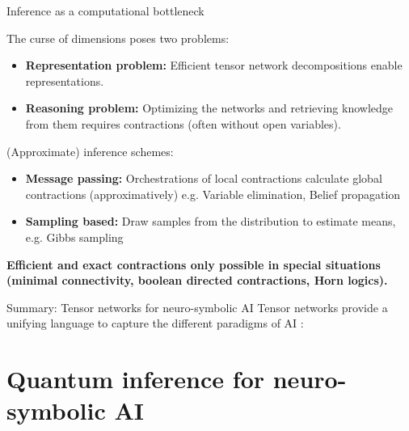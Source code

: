 \documentclass{beamer}
\begin{document}
    \begin{frame}{Inference as a computational bottleneck}

        The curse of dimensions poses two problems:
        \begin{itemize}
            \item {\bf Representation problem:} Efficient tensor network decompositions enable representations.
            \item {\bf Reasoning problem:} Optimizing the networks and retrieving knowledge from them requires contractions (often without open variables).
        \end{itemize}

        (Approximate) inference schemes:
        \begin{itemize}
            \item {\bf Message passing:} Orchestrations of local contractions calculate global contractions (approximatively) e.g. Variable elimination, Belief propagation
            \item {\bf Sampling based:} Draw samples from the distribution to estimate means, e.g. Gibbs sampling
        \end{itemize}
        \begin{center}
            \bf Efficient and exact contractions only possible in special situations (minimal connectivity, boolean directed contractions, Horn logics).
        \end{center}
    \end{frame}


    \begin{frame}{Summary: Tensor networks for neuro-symbolic AI}
        Tensor networks provide a unifying language to capture the different paradigms of AI \cite{goessmann_tensor_2026}:
        \begin{center}
            
        \end{center}
    \end{frame}


    \section{Quantum inference for neuro-symbolic AI}
\end{document}
